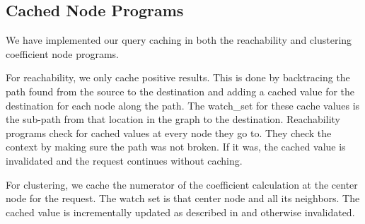 \documentclass[letterpaper,twocolumn,11pt,tight]{article}
\begin{document}
\subsection{Cached Node Programs}
We have implemented our query caching in both the reachability and clustering coefficient node programs.

For reachability, we only cache positive results. This is done by backtracing the path found from the source to the destination and adding a cached value for the destination for each node along the path. The watch\_set for these cache values is the sub-path from that location in the graph to the destination. Reachability programs check for cached values at every node they go to. They check the context by making sure the path was not broken. If it was, the cached value is invalidated and the request continues without caching.

For clustering, we cache the numerator of the coefficient calculation at the center node for the request. The watch set is that center node and all its neighbors. The cached value is incrementally updated as described in  and otherwise invalidated.
\end{document}
